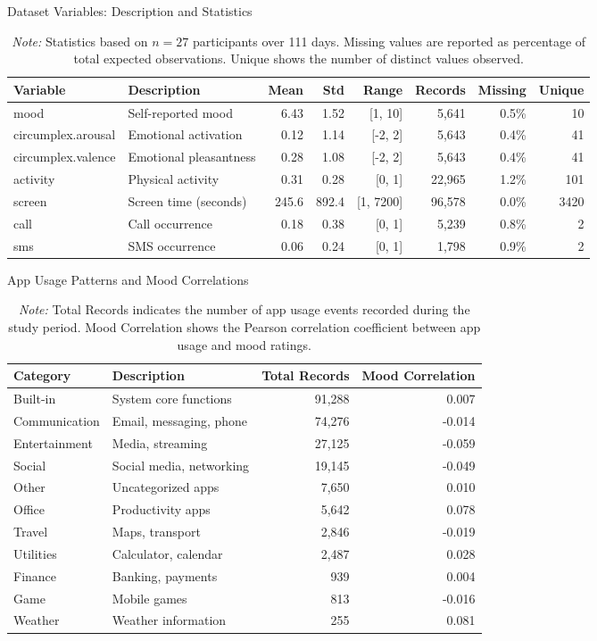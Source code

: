 \documentclass[11pt,a4paper]{article}
\begin{document}
\begin{table}[htbp]
\centering
\caption{Dataset Variables: Description and Statistics}
\label{tab:variables}
\begin{tabular}{lp{3.2cm}rrrrrr}
\toprule
\textbf{Variable} & \textbf{Description} & \textbf{Mean} & \textbf{Std} & \textbf{Range} & \textbf{Records} & \textbf{Missing} & \textbf{Unique} \\
\midrule
mood & Self-reported mood & 6.43 & 1.52 & [1, 10] & 5,641 & 0.5\% & 10 \\
circumplex.arousal & Emotional activation & 0.12 & 1.14 & [-2, 2] & 5,643 & 0.4\% & 41 \\
circumplex.valence & Emotional pleasantness & 0.28 & 1.08 & [-2, 2] & 5,643 & 0.4\% & 41 \\
activity & Physical activity & 0.31 & 0.28 & [0, 1] & 22,965 & 1.2\% & 101 \\
screen & Screen time (seconds) & 245.6 & 892.4 & [1, 7200] & 96,578 & 0.0\% & 3420 \\
call & Call occurrence & 0.18 & 0.38 & [0, 1] & 5,239 & 0.8\% & 2 \\
sms & SMS occurrence & 0.06 & 0.24 & [0, 1] & 1,798 & 0.9\% & 2 \\
\bottomrule
\end{tabular}
\caption*{\textit{Note:} Statistics based on ${n=27}$ participants over 111 days. Missing values are reported as percentage of total expected observations. Unique shows the number of distinct values observed.}
\end{table}

\begin{table}[htbp]
\centering
\caption{App Usage Patterns and Mood Correlations}
\label{tab:app-usage}
\begin{tabular}{llrr}
\toprule
\textbf{Category} & \textbf{Description} & \textbf{Total Records} & \textbf{Mood Correlation} \\
\midrule
Built-in & System core functions & 91,288 & 0.007 \\
Communication & Email, messaging, phone & 74,276 & -0.014 \\
Entertainment & Media, streaming & 27,125 & -0.059 \\
Social & Social media, networking & 19,145 & -0.049 \\
Other & Uncategorized apps & 7,650 & 0.010 \\
Office & Productivity apps & 5,642 & 0.078 \\
Travel & Maps, transport & 2,846 & -0.019 \\
Utilities & Calculator, calendar & 2,487 & 0.028 \\
Finance & Banking, payments & 939 & 0.004 \\
Game & Mobile games & 813 & -0.016 \\
Weather & Weather information & 255 & 0.081 \\
\bottomrule
\end{tabular}
\caption*{\textit{Note:} Total Records indicates the number of app usage events recorded during the study period. Mood Correlation shows the Pearson correlation coefficient between app usage and mood ratings.}
\end{table}
\end{document}
